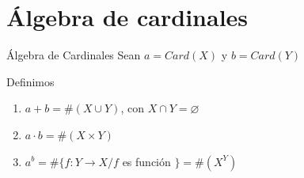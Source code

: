 \section{Álgebra de cardinales}

\begin{definicion}{Álgebra de Cardinales}{}
    Sean $a = Card(X)$ y $b = Card(Y)$

    Definimos
    \begin{enumerate}
        \item $a + b = \# (X \cup Y)$, con $X \cap Y = \varnothing$
        \item $a \cdot b = \# (X \times Y)$
        \item $a^b = \# \{ f: Y \to X / f $ es función
            $\} = \# \left({X}^{Y}\right)$
    \end{enumerate}

\end{definicion}

